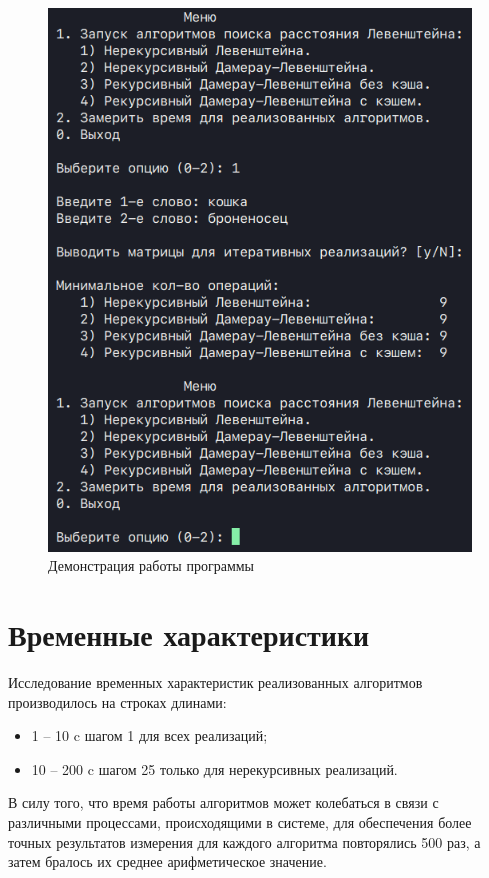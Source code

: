 \clearpage
\begin{figure}[h]
    \centering
    \includegraphics[height=0.6\textheight]{images/prog_demo.png}
    \caption{Демонстрация работы программы}
    \label{fig:prog-demo}
\end{figure}

\section{Временные характеристики}

Исследование временных характеристик реализованных алгоритмов производилось на строках длинами:

\begin{itemize}
    \item 1 -- 10 c шагом 1 для всех реализаций;
    \item 10 -- 200 c шагом 25 только для нерекурсивных реализаций.
\end{itemize}

В силу того, что время работы алгоритмов может колебаться в связи с различными процессами, происходящими в системе, для обеспечения более точных результатов измерения для каждого алгоритма повторялись 500 раз, а затем бралось их среднее арифметическое значение.

